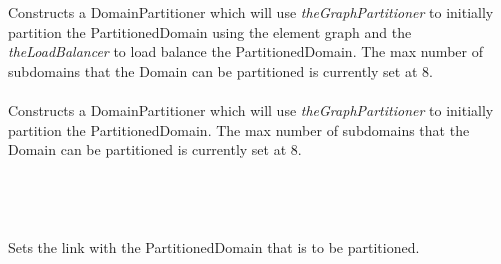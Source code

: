   \\
 \\
Constructs a DomainPartitioner which will use {\em
theGraphPartitioner} to initially partition the PartitionedDomain
using the element graph and the {\em theLoadBalancer} to load balance 
the PartitionedDomain. The max number of subdomains that the Domain can be 
partitioned is currently set at 8.\\

\\
Constructs a DomainPartitioner which will use {\em
theGraphPartitioner} to initially partition the PartitionedDomain. The
max number of subdomains that the Domain can be partitioned is
currently set at 8.\\ 

  \\
  \\


  \\
\\
Sets the link with the PartitionedDomain that is to be partitioned. \\


